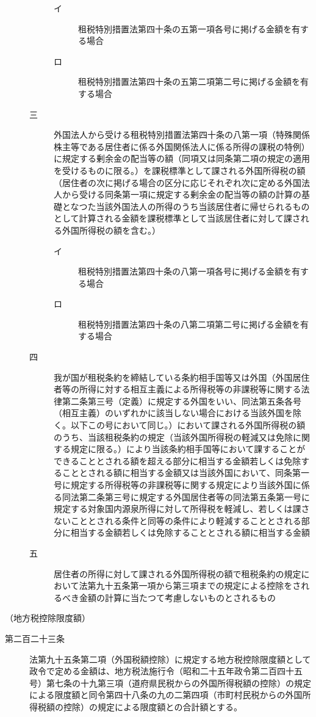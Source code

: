 \documentclass[twocolumn,a4j,10pt]{ltjtarticle}
\begin{document}
\begin{description}
\begin{description}
\begin{description}
\item[イ]租税特別措置法第四十条の五第一項各号に掲げる金額を有する場合
\item[ロ]租税特別措置法第四十条の五第二項第二号に掲げる金額を有する場合
\end{description}
\item[三]外国法人から受ける租税特別措置法第四十条の八第一項（特殊関係株主等である居住者に係る外国関係法人に係る所得の課税の特例）に規定する剰余金の配当等の額（同項又は同条第二項の規定の適用を受けるものに限る。）を課税標準として課される外国所得税の額（居住者の次に掲げる場合の区分に応じそれぞれ次に定める外国法人から受ける同条第一項に規定する剰余金の配当等の額の計算の基礎となつた当該外国法人の所得のうち当該居住者に帰せられるものとして計算される金額を課税標準として当該居住者に対して課される外国所得税の額を含む。）
\begin{description}
\item[イ]租税特別措置法第四十条の八第一項各号に掲げる金額を有する場合
\item[ロ]租税特別措置法第四十条の八第二項第二号に掲げる金額を有する場合
\end{description}
\item[四]我が国が租税条約を締結している条約相手国等又は外国（外国居住者等の所得に対する相互主義による所得税等の非課税等に関する法律第二条第三号（定義）に規定する外国をいい、同法第五条各号（相互主義）のいずれかに該当しない場合における当該外国を除く。以下この号において同じ。）において課される外国所得税の額のうち、当該租税条約の規定（当該外国所得税の軽減又は免除に関する規定に限る。）により当該条約相手国等において課することができることとされる額を超える部分に相当する金額若しくは免除することとされる額に相当する金額又は当該外国において、同条第一号に規定する所得税等の非課税等に関する規定により当該外国に係る同法第二条第三号に規定する外国居住者等の同法第五条第一号に規定する対象国内源泉所得に対して所得税を軽減し、若しくは課さないこととされる条件と同等の条件により軽減することとされる部分に相当する金額若しくは免除することとされる額に相当する金額
\item[五]居住者の所得に対して課される外国所得税の額で租税条約の規定において法第九十五条第一項から第三項までの規定による控除をされるべき金額の計算に当たつて考慮しないものとされるもの
\end{description}
\end{description}
\noindent\hspace{10pt}（地方税控除限度額）
\begin{description}
\item[第二百二十三条]法第九十五条第二項（外国税額控除）に規定する地方税控除限度額として政令で定める金額は、地方税法施行令（昭和二十五年政令第二百四十五号）第七条の十九第三項（道府県民税からの外国所得税額の控除）の規定による限度額と同令第四十八条の九の二第四項（市町村民税からの外国所得税額の控除）の規定による限度額との合計額とする。
\end{description}
\end{document}
